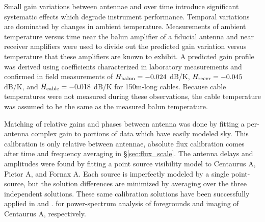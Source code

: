 \documentclass[preprint]{aastex}
\begin{document}

Small gain variations between antennae and over time introduce significant systematic effects which degrade 
instrument performance. Temporal variations are dominated by changes in ambient temperature. 
Measurements of ambient temperature versus time near the balun amplifier of a fiducial antenna and near
receiver amplifiers were used to divide out the predicted gain variation versus temperature that these amplifiers
are known to exhibit.  A predicted gain profile was derived using coefficients characterized in
laboratory measurements \citep{parashare_bradley2009} and
confirmed in field measurements \citep{pober_et_al2011} of $H_{\rm balun}=-0.024$ dB/K, $H_{\rm recvr}=-0.045$
dB/K, and $H_{\rm cable}=-0.018$ dB/K for 150m-long cables.  Because cable temperatures were not measured
during these observations, the cable temperature was assumed to be the same as the measured balun temperature.


Matching of relative gains and phases between antenna was done by fitting a per-antenna complex gain to portions
of data which have easily modeled sky. 
This calibration is only relative between antennae, absolute flux calibration
comes after time and frequency averaging in  \S \ref{sec:flux_scale}.   
The antenna delays and amplitudes were found by fitting a point source visibility
model to Centaurus A, Pictor A, and Fornax A.  Each source is imperfectly
modeled by a single point-source, but the solution differences are minimized by
averaging over the three independent solutions. These same calibration
solutions have been successfully applied in \citet{Pober:2013XXX} and \citet{Stefan:2013:XXX}.
for power-spectrum analysis of foregrounds and imaging of Centaurus A, respectively.

\end{document}

